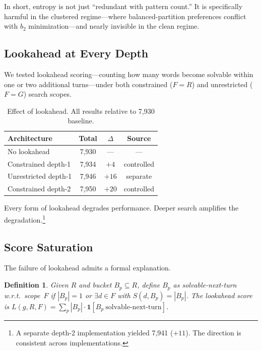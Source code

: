 \documentclass[11pt]{article}
\newtheorem{definition}{Definition}
\begin{document}
	In short, entropy is not just ``redundant with pattern count.''  It is specifically harmful in the clustered regime---where balanced-partition preferences conflict with $b_2$ minimization---and nearly invisible in the clean regime.
	
	\subsection{Lookahead at Every Depth}
	
	We tested lookahead scoring---counting how many words become solvable within one or two additional turns---under both constrained ($F = R$) and unrestricted ($F = G$) search scopes.
	
	\begin{table}[h]
		\centering
		\caption{Effect of lookahead.  All results relative to 7,930 baseline.}
		\label{tab:lookahead}
		\begin{tabular}{@{}lccc@{}}
			\toprule
			Architecture & Total & $\Delta$ & Source \\
			\midrule
			No lookahead & 7,930 & --- & --- \\
			Constrained depth-1 & 7,934 & $+4$ & controlled \\
			Unrestricted depth-1 & 7,946 & $+16$ & separate \\
			Constrained depth-2 & 7,950 & $+20$ & controlled \\
			\bottomrule
		\end{tabular}
	\end{table}
	
	Every form of lookahead degrades performance.  Deeper search amplifies the degradation.\footnote{A separate depth-2 implementation yielded 7,941 ($+11$).  The direction is consistent across implementations.}
	
	\subsection{Score Saturation}
	
	The failure of lookahead admits a formal explanation.
	
	\begin{definition}
		Given $R$ and bucket $B_p \subseteq R$, define $B_p$ as \emph{solvable-next-turn} w.r.t.\ scope~$F$ if $|B_p| = 1$ or $\exists d \in F$ with $S(d, B_p) = |B_p|$.  The lookahead score is $L(g,R,F) = \sum_p |B_p| \cdot \mathbf{1}[B_p\ \text{solvable-next-turn}]$.
	\end{definition}
	
\end{document}

